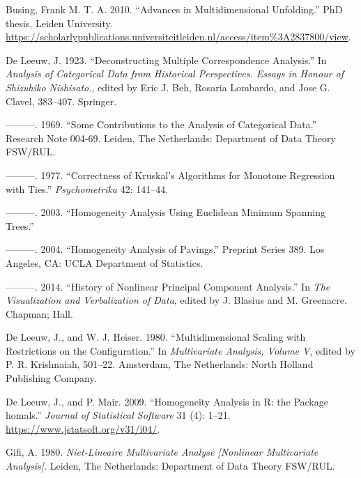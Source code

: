 \documentclass[
  12pt,
  letterpaper,
  DIV=11,
  numbers=noendperiod]{scrartcl}
\newlength{\cslhangindent}
\newenvironment{CSLReferences}[2] %
 {\begin{list}{}{%
  \setlength{\itemindent}{0pt}
  \setlength{\leftmargin}{0pt}
  \setlength{\parsep}{0pt}
  \ifodd #1
   \setlength{\leftmargin}{\cslhangindent}
   \setlength{\itemindent}{-1\cslhangindent}
  \fi
  \setlength{\itemsep}{#2\baselineskip}}}
 {\end{list}}
\begin{document}
\label{refs}
\begin{CSLReferences}{1}{0}
Busing, Frank M. T. A. 2010. {``Advances in Multidimensional
Unfolding.''} PhD thesis, Leiden University.
\url{https://scholarlypublications.universiteitleiden.nl/access/item\%3A2837800/view}.

De Leeuw, J. 1923. {``Deconstructing Multiple Correspondence
Analysis.''} In \emph{Analysis of Categorical Data from Historical
Perspectives. Essays in Honour of Shizuhiko Nishisato.}, edited by Eric
J. Beh, Rosaria Lombardo, and Jose G. Clavel, 383--407. Springer.

---------. 1969. {``{Some Contributions to the Analysis of Categorical
Data}.''} Research Note 004-69. Leiden, The Netherlands: Department of
Data Theory FSW/RUL.

---------. 1977. {``Correctness of Kruskal's Algorithms for Monotone
Regression with Ties.''} \emph{Psychometrika} 42: 141--44.

---------. 2003. {``{Homogeneity Analysis Using Euclidean Minimum
Spanning Trees}.''}

---------. 2004. {``{Homogeneity Analysis of Pavings}.''} Preprint
Series 389. Los Angeles, CA: UCLA Department of Statistics.

---------. 2014. {``{History of Nonlinear Principal Component
Analysis}.''} In \emph{{The Visualization and Verbalization of Data}},
edited by J. Blasius and M. Greenacre. Chapman; Hall.

De Leeuw, J., and W. J. Heiser. 1980. {``Multidimensional Scaling with
Restrictions on the Configuration.''} In \emph{Multivariate Analysis,
Volume {V}}, edited by P. R. Krishnaiah, 501--22. Amsterdam, The
Netherlands: North Holland Publishing Company.

De Leeuw, J., and P. Mair. 2009. {``{Homogeneity Analysis in {R}: the
Package homals}.''} \emph{Journal of Statistical Software} 31 (4):
1--21. \url{https://www.jstatsoft.org/v31/i04/}.

Gifi, A. 1980. \emph{Niet-Lineaire Multivariate Analyse {[}Nonlinear
Multivariate Analysis{]}}. Leiden, The Netherlands: Department of Data
Theory FSW/RUL.


\end{CSLReferences}
\end{document}
